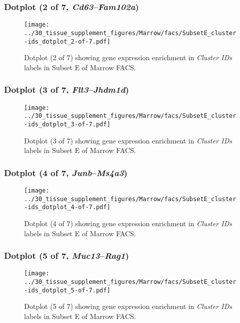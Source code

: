 \clearpage

\subsubsection{Dotplot (2 of 7, \emph{Cd63}--\emph{Fam102a})}
\begin{figure}[h]
\centering
\texttt{[image: ../30\_tissue\_supplement\_figures/Marrow/facs/SubsetE\_cluster-ids\_dotplot\_2-of-7.pdf]}

\caption{ Dotplot (2 of 7)  showing gene expression enrichment in \emph{Cluster IDs} labels in Subset E of Marrow FACS. }
\end{figure}


\clearpage

\subsubsection{Dotplot (3 of 7, \emph{Flt3}--\emph{Jhdm1d})}
\begin{figure}[h]
\centering
\texttt{[image: ../30\_tissue\_supplement\_figures/Marrow/facs/SubsetE\_cluster-ids\_dotplot\_3-of-7.pdf]}

\caption{ Dotplot (3 of 7)  showing gene expression enrichment in \emph{Cluster IDs} labels in Subset E of Marrow FACS. }
\end{figure}


\clearpage

\subsubsection{Dotplot (4 of 7, \emph{Junb}--\emph{Ms4a3})}
\begin{figure}[h]
\centering
\texttt{[image: ../30\_tissue\_supplement\_figures/Marrow/facs/SubsetE\_cluster-ids\_dotplot\_4-of-7.pdf]}

\caption{ Dotplot (4 of 7)  showing gene expression enrichment in \emph{Cluster IDs} labels in Subset E of Marrow FACS. }
\end{figure}


\clearpage

\subsubsection{Dotplot (5 of 7, \emph{Muc13}--\emph{Rag1})}
\begin{figure}[h]
\centering
\texttt{[image: ../30\_tissue\_supplement\_figures/Marrow/facs/SubsetE\_cluster-ids\_dotplot\_5-of-7.pdf]}

\caption{ Dotplot (5 of 7)  showing gene expression enrichment in \emph{Cluster IDs} labels in Subset E of Marrow FACS. }
\end{figure}


